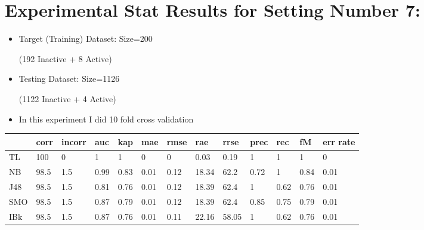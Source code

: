 \documentclass[a4paper,12pt, english]{article}
\begin{document}
\section{Experimental Stat Results for Setting Number 7:}
\begin{itemize}
\item Target (Training) Dataset: Size=200 \begin{scriptsize}(192 Inactive + 8 Active)\end{scriptsize}
\item Testing Dataset: Size=1126 \begin{scriptsize}(1122 Inactive + 4 Active)\end{scriptsize}
\item In this experiment I did 10 fold cross validation
\end{itemize}  
\begin{small}
\begin{center}
    \begin{tabular}{ | l | l | l | l | l | l | l | l | l | l | l | l | l |}
    \hline
      	& corr & incorr  & auc & kap & mae & rmse & rae & rrse & prec & rec & fM & err rate\\ \hline
      	TL & 100 & 0 & 1 & 1 & 0 & 0 & 0.03 & 0.19 & 1 & 1 & 1 & 0\\ \hline
	NB & 98.5 & 1.5 & 0.99 & 0.83 & 0.01 & 0.12 & 18.34 & 62.2 & 0.72 & 1 & 0.84 & 0.01\\ \hline
	J48 & 98.5 & 1.5 & 0.81 & 0.76 & 0.01 & 0.12 & 18.39 & 62.4 & 1 & 0.62 & 0.76 & 0.01\\ \hline
	SMO & 98.5 & 1.5 & 0.87 & 0.79 & 0.01 & 0.12 & 18.39 & 62.4 & 0.85 & 0.75 & 0.79 & 0.01\\ \hline
	IBk & 98.5 & 1.5 & 0.87 & 0.76 & 0.01 & 0.11 & 22.16 & 58.05 & 1 & 0.62 & 0.76 & 0.01\\ \hline  
    \end{tabular}       
\end{center}
\end{small}
\end{document}
